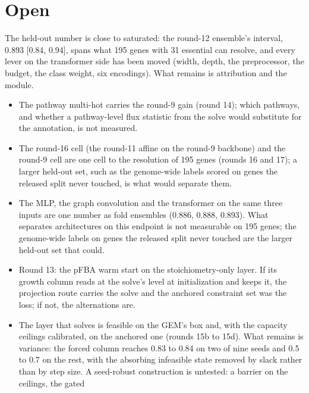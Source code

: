 
\section{Open}
\label{sec:open}

The held-out number is close to saturated: the round-12 ensemble's interval, 0.893
[0.84, 0.94], spans what 195 genes with 31 essential can resolve, and every lever on the
transformer side has been moved (width, depth, the preprocessor, the budget, the class
weight, six encodings). What remains is attribution and the module.

\begin{itemize}
  \item The pathway multi-hot carries the round-9 gain (round 14); which pathways, and
    whether a pathway-level flux statistic from the solve would substitute for the
    annotation, is not measured.
  \item The round-16 cell (the round-11 affine on the round-9 backbone) and the round-9
    cell are one cell to the resolution of 195 genes (rounds 16 and 17); a larger
    held-out set, such as the genome-wide labels scored on genes the released split
    never touched, is what would separate them.
  \item The MLP, the graph convolution and the transformer on the same three inputs are
    one number as fold ensembles (0.886, 0.888, 0.893). What separates architectures on
    this endpoint is not measurable on 195 genes; the genome-wide labels on genes the
    released split never touched are the larger held-out set that could.
  \item Round 13: the pFBA warm start on the stoichiometry-only layer. If its growth
    column reads at the solve's level at initialization and keeps it, the projection
    route carries the solve and the anchored constraint set was the loss; if not, the
    alternations are.
  \item The layer that solves is feasible on the GEM's box and, with the capacity
    ceilings calibrated, on the anchored one (rounds 15b to 15d). What remains is
    variance: the forced column reaches 0.83 to 0.84 on two of nine seeds and 0.5 to 0.7
    on the rest, with the absorbing infeasible state removed by slack rather than by step
    size. A seed-robust construction is untested: a barrier on the ceilings, the gated

\end{itemize}
